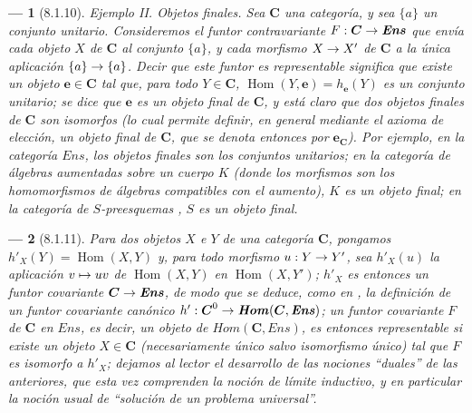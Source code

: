 \documentclass[10pt,oneside,openany]{book}
\makeatletter
\theoremstyle{egaenv}\newtheorem*{env}{---}
\theoremstyle{egastatement}
\theoremstyle{egadescription}
\let\ega@shortmapsto\mapsto
\renewcommand{\to}{\mathchoice{\longrightarrow}{\rightarrow}{\rightarrow}{\rightarrow}}
\renewcommand{\mapsto}{\mathchoice{\longmapsto}{\ega@shortmapsto}{\ega@shortmapsto}{\ega@shortmapsto}}
\makeatother
\begin{document}
\begin{env}[8.1.10]
\label{0.8.1.10}
\label{0.8.1.10-fr}
\textit{Ejemplo II. Objetos finales}.
Sea $\boldsymbol{C}$ una categoría, y sea $\{a\}$ un conjunto unitario.
Consideremos el funtor contravariante $F:\boldsymbol{C}\to\boldsymbol{\mathit{Ens}}$ que envía cada objeto $X$ de $\boldsymbol{C}$ al conjunto $\{a\}$, y cada morfismo $X\to X'$ de $\boldsymbol{C}$ a la única aplicación $\{a\}\to\{a\}$.
Decir que este funtor es \emph{representable} significa que existe un objeto $\boldsymbol{e}\in\boldsymbol{C}$ tal que, para todo $Y\in\boldsymbol{C}$, $\operatorname{Hom}(Y,\boldsymbol{e})=h_{\mathbf{e}}(Y)$ es un \emph{conjunto unitario}; se dice que $\boldsymbol{e}$ es un \emph{objeto final} de $\boldsymbol{C}$, y está claro que dos objetos finales de $\boldsymbol{C}$ son isomorfos (lo cual permite definir, en general mediante el axioma de elección, \emph{un} objeto final de $\boldsymbol{C}$, que se denota entonces por $\boldsymbol{e}_{\mathbf{C}}$).
Por ejemplo, en la categoría $\boldsymbol{\mathit{Ens}}$, los objetos finales son los conjuntos unitarios; en la categoría de \emph{álgebras aumentadas} sobre un cuerpo $K$ (donde los morfismos son los homomorfismos de álgebras compatibles con el aumento), $K$ es un objeto final; en la categoría de \emph{$S$-preesquemas} , $S$ es un objeto final.
\end{env}

\begin{env}[8.1.11]
\label{0.8.1.11}
\label{0.8.1.11-fr}
Para dos objetos $X$ e $Y$ de una categoría $\boldsymbol{C}$, pongamos $h'_X(Y)=\operatorname{Hom}(X,Y)$ y, para todo morfismo $u:Y\to Y'$, sea $h'_X(u)$ la aplicación $v\mapsto uv$ de $\operatorname{Hom}(X,Y)$ en $\operatorname{Hom}(X,Y')$; $h'_X$ es entonces un \emph{funtor covariante $\boldsymbol{C}\to\boldsymbol{\mathit{Ens}}$}, de modo que se deduce, como en , la definición de un funtor covariante canónico $h':\boldsymbol{C}^0\to\boldsymbol{\mathit{Hom}}(\boldsymbol{C},\boldsymbol{\mathit{Ens}})$; un funtor \emph{covariante} $F$ de $\boldsymbol{C}$ en $\boldsymbol{\mathit{Ens}}$, es decir, \emph{un} objeto de $\boldsymbol{\mathit{Hom}}(\boldsymbol{C},\boldsymbol{\mathit{Ens}})$, es entonces \emph{representable} si existe un objeto $X\in\boldsymbol{C}$ (necesariamente único salvo isomorfismo único) tal que $F$ es \emph{isomorfo a $h'_X$}; dejamos al lector el desarrollo de las nociones ``duales'' de las anteriores, que esta vez comprenden la noción de \emph{límite inductivo}, y en particular la noción usual de ``solución de un problema universal''.
\end{env}
\end{document}

